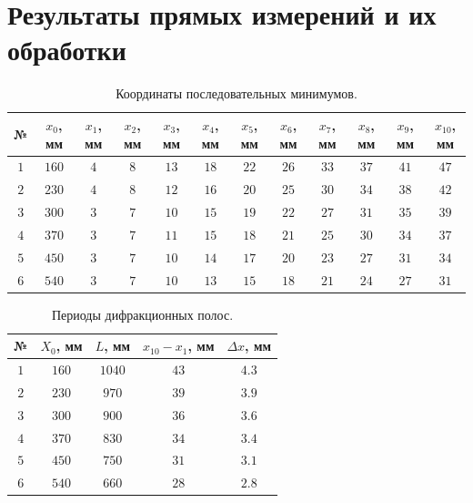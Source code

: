 \documentclass{article}
\begin{document}
\section{Результаты прямых измерений и их обработки}
\begin{table}[h]
    \centering
    \bgroup
    \def\arraystretch{1.4}
    \begin{tabular}{|c|c|c|c|c|c|c|c|c|c|c|c|}
        \hline
        № & $x_{0}$, мм & $x_{1}$, мм & $x_{2}$, мм & $x_{3}$, мм & $x_{4}$, мм & $x_{5}$, мм & $x_{6}$, мм & $x_{7}$, мм & $x_{8}$, мм & $x_{9}$, мм & $x_{10}$, мм \\ \hline
        $ 1 $ & $ 160 $ & $ 4 $ & $ 8 $ & $ 13 $ & $ 18 $ & $ 22 $ & $ 26 $ & $ 33 $ & $ 37 $ & $ 41 $ & $ 47 $\\ \hline
        $ 2 $ & $ 230 $ & $ 4 $ & $ 8 $ & $ 12 $ & $ 16 $ & $ 20 $ & $ 25 $ & $ 30 $ & $ 34 $ & $ 38 $ & $ 42 $\\ \hline
        $ 3 $ & $ 300 $ & $ 3 $ & $ 7 $ & $ 10 $ & $ 15 $ & $ 19 $ & $ 22 $ & $ 27 $ & $ 31 $ & $ 35 $ & $ 39 $\\ \hline
        $ 4 $ & $ 370 $ & $ 3 $ & $ 7 $ & $ 11 $ & $ 15 $ & $ 18 $ & $ 21 $ & $ 25 $ & $ 30 $ & $ 34 $ & $ 37 $\\ \hline
        $ 5 $ & $ 450 $ & $ 3 $ & $ 7 $ & $ 10 $ & $ 14 $ & $ 17 $ & $ 20 $ & $ 23 $ & $ 27 $ & $ 31 $ & $ 34 $\\ \hline
        $ 6 $ & $ 540 $ & $ 3 $ & $ 7 $ & $ 10 $ & $ 13 $ & $ 15 $ & $ 18 $ & $ 21 $ & $ 24 $ & $ 27 $ & $ 31 $\\ \hline
    \end{tabular}
    \egroup
    \caption{Координаты последовательных минимумов.} 
\end{table}
\begin{table}[h]
    \centering
    \bgroup
    \def\arraystretch{1.4}
    \begin{tabular}{|c|c|c|c|c|}
        \hline
        № & $X_{0}$, мм & $L$, мм & $x_{10}-x_{1}$, мм & $\Delta x$, мм\\ \hline
        $1$ & $ 160 $ & $ 1040 $ & $ 43 $ & $ 4.3 $\\ \hline
        $2$ & $ 230 $ & $ 970 $ & $ 39 $ & $ 3.9 $\\ \hline
        $3$ & $ 300 $ & $ 900 $ & $ 36 $ & $ 3.6 $\\ \hline
        $4$ & $ 370 $ & $ 830 $ & $ 34 $ & $ 3.4 $\\ \hline
        $5$ & $ 450 $ & $ 750 $ & $ 31 $ & $ 3.1 $\\ \hline
        $6$ & $ 540 $ & $ 660 $ & $ 28 $ & $ 2.8 $\\ \hline
    \end{tabular}
    \egroup
    \caption{Периоды дифракционных полос.} 
\end{table}
\newpage
\end{document}
